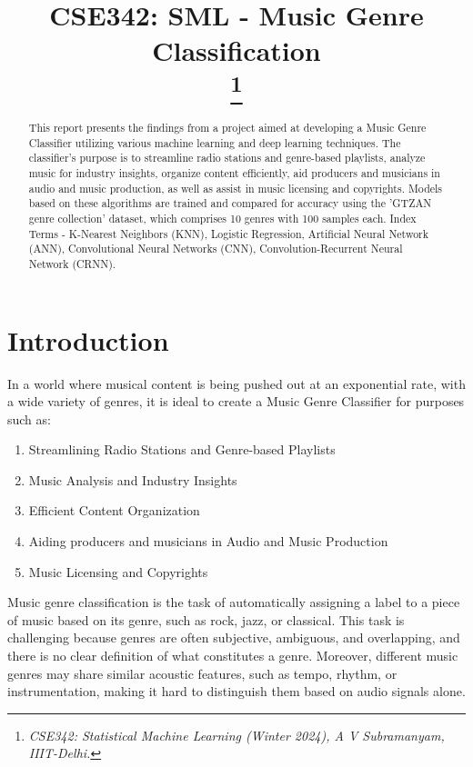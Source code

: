 \documentclass[conference]{IEEEtran}
\title{
    CSE342: SML - Music Genre Classification \\
    \thanks{\textit{
        CSE342: Statistical Machine Learning (Winter 2024),
        A V Subramanyam, IIIT-Delhi.
    }}
}
\author{
    \IEEEauthorblockN{Mehul Agarwal} \vspace*{3.0pt}
    \IEEEauthorblockA{
        \textit{Computer Science \& Engineering Dept.} \\
        \textit{IIIT-Delhi, India} \\
        mehul22294@iiitd.ac.in
    }
    \and
    \IEEEauthorblockN{Rahul Omalur Ramesh} \vspace*{3.0pt}
    \IEEEauthorblockA{
        \textit{Computer Science \& Engineering Dept.} \\
        \textit{IIIT-Delhi, India} \\
        rahul22392@iiitd.ac.in
    }
}
\begin{document}
    \maketitle

    \begin{abstract}
        This report presents the findings from a project aimed at developing a Music Genre Classifier utilizing various machine learning and deep learning techniques. The classifier's purpose is to streamline radio stations and genre-based playlists, analyze music for industry insights, organize content efficiently, aid producers and musicians in audio and music production, as well as assist in music licensing and copyrights. Models based on these algorithms are trained and compared for accuracy using the 'GTZAN genre collection' dataset, which comprises 10 genres with 100 samples each. Index Terms - K-Nearest Neighbors (KNN), Logistic Regression, Artificial Neural Network (ANN), Convolutional Neural Networks (CNN), Convolution-Recurrent Neural Network (CRNN).
    \end{abstract}

\section{Introduction}
    In a world where musical content is being pushed out at an exponential rate, with a wide variety of genres, it is ideal to create a Music Genre Classifier for purposes such as:

    \begin{enumerate}
        \item Streamlining Radio Stations and Genre-based Playlists
        \item Music Analysis and Industry Insights
        \item Efficient Content Organization
        \item Aiding producers and musicians in Audio and Music Production
        \item Music Licensing and Copyrights
    \end{enumerate}
    
    Music genre classification is the task of automatically assigning a label to a piece of music based on its genre, such as rock, jazz, or classical. This task is challenging because genres are often subjective, ambiguous, and overlapping, and there is no clear definition of what constitutes a genre. Moreover, different music genres may share similar acoustic features, such as tempo, rhythm, or instrumentation, making it hard to distinguish them based on audio signals alone.
\end{document}
